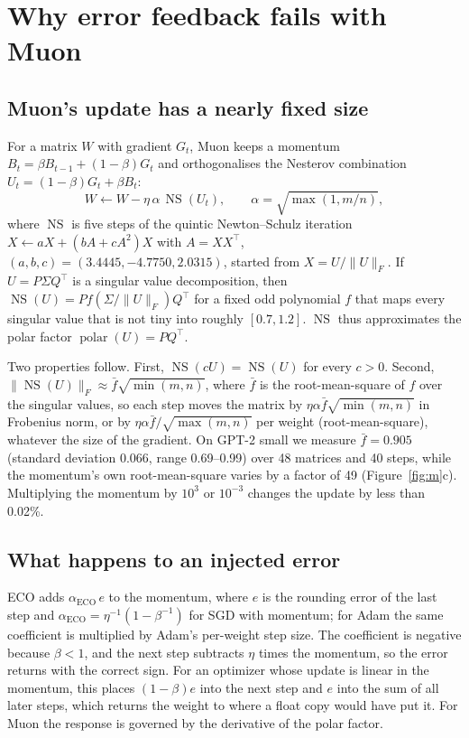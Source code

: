 \documentclass[11pt]{article}
\newcommand{\NS}{\operatorname{NS}}
\newcommand{\polar}{\operatorname{polar}}
\newcommand{\norm}[1]{\lVert #1 \rVert}
\begin{document}
\section{Why error feedback fails with Muon}\label{sec:mechanism}

\subsection{Muon's update has a nearly fixed size}
For a matrix $W$ with gradient $G_t$, Muon \citep{jordan2024muon} keeps a momentum $B_t = \beta B_{t-1} + (1-\beta) G_t$
and orthogonalises the Nesterov combination $U_t = (1-\beta)G_t + \beta B_t$:
\[
  W \leftarrow W - \eta\, \alpha\, \NS(U_t), \qquad \alpha = \sqrt{\max(1, m/n)} ,
\]
where $\NS$ is five steps of the quintic Newton--Schulz iteration $X \leftarrow aX + (bA + cA^2)X$ with $A = XX^\top$,
$(a,b,c) = (3.4445, -4.7750, 2.0315)$, started from $X = U/\norm{U}_F$. If $U = P\Sigma Q^\top$ is a singular value
decomposition, then $\NS(U) = P f(\Sigma/\norm{U}_F) Q^\top$ for a fixed odd polynomial $f$ that maps every singular
value that is not tiny into roughly $[0.7, 1.2]$. $\NS$ thus approximates the polar factor $\polar(U) = PQ^\top$.

Two properties follow. First, $\NS(cU) = \NS(U)$ for every $c>0$. Second,
$\norm{\NS(U)}_F \approx \bar f \sqrt{\min(m,n)}$, where $\bar f$ is the root-mean-square of $f$ over the singular
values, so each step moves the matrix by $\eta\alpha\bar f\sqrt{\min(m,n)}$ in Frobenius norm, or by
$\eta\alpha\bar f/\sqrt{\max(m,n)}$ per weight (root-mean-square), whatever the size of the gradient. On GPT-2 small we
measure $\bar f = 0.905$ (standard deviation 0.066, range 0.69--0.99) over 48 matrices and 40 steps, while the
momentum's own root-mean-square varies by a factor of 49 (Figure~\ref{fig:m}c). Multiplying the momentum by $10^{3}$
or $10^{-3}$ changes the update by less than 0.02\%.

\subsection{What happens to an injected error}
ECO adds $\alpha_{\text{ECO}}\, e$ to the momentum, where $e$ is the rounding error of the last step and
$\alpha_{\text{ECO}} = \eta^{-1}(1-\beta^{-1})$ for SGD with momentum; for Adam the same coefficient is multiplied by
Adam's per-weight step size. The coefficient is negative because $\beta < 1$, and the next step subtracts $\eta$ times
the momentum, so the error returns with the correct sign. For an optimizer whose update is linear in the momentum,
this places $(1-\beta)e$ into the next step and $e$ into the sum of all later steps, which returns the weight to where
a float copy would have put it. For Muon the response is governed by the derivative of the polar factor.
\end{document}
